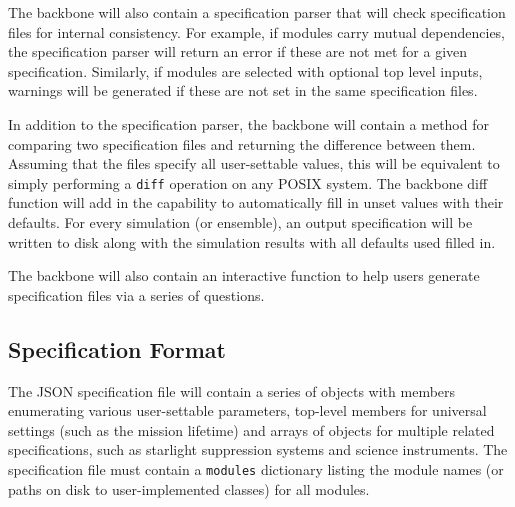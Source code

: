 \documentclass[cleanfoot]{asme2ej}
\begin{document}
The backbone will also contain a specification parser that will check specification files for internal consistency.  For example, if modules carry mutual dependencies, the specification parser will return an error if these are not met for a given specification.  Similarly, if modules are selected with optional top level inputs, warnings will be generated if these are not set in the same specification files.

In addition to the specification parser, the backbone will contain a method for comparing two specification files and returning the difference between them.  Assuming that the files specify all user-settable values, this will be equivalent to simply performing a \verb+diff+ operation on any POSIX system.  The backbone diff function will add in the capability to automatically fill in unset values with their defaults.  For every simulation (or ensemble), an output specification will be written to disk along with the simulation results with all defaults used filled in.

The backbone will also contain an interactive function to help users generate specification files via a series of questions.

\subsection{Specification Format}\label{sec:inputspec}
The JSON specification file will contain a series of objects with members enumerating various user-settable parameters, top-level members for universal settings (such as the mission lifetime) and arrays of objects for multiple related specifications, such as starlight suppression systems and science instruments.  The specification file must contain a \verb+modules+ dictionary listing the module names (or paths on disk to user-implemented classes) for all modules.
\end{document}
